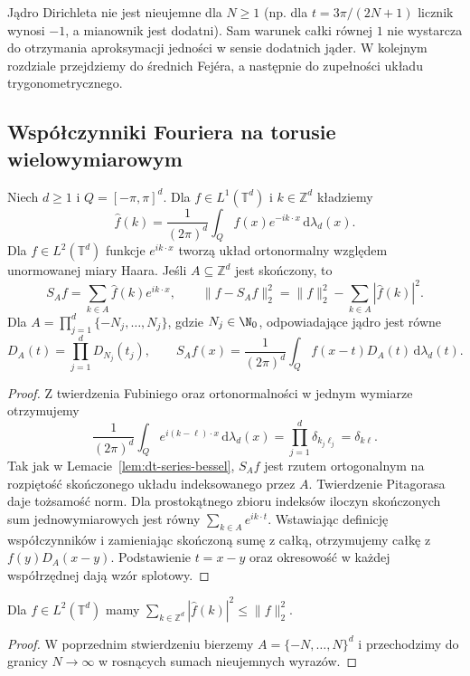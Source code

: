 Jądro Dirichleta nie jest nieujemne dla $N\ge1$
(np. dla $t=3\pi/(2N+1)$ licznik wynosi $-1$,
a mianownik jest dodatni). Sam warunek całki
równej $1$ nie wystarcza do otrzymania aproksymacji
jedności w sensie dodatnich jąder. W kolejnym
rozdziale przejdziemy do średnich Fejéra, a następnie
do zupełności układu trygonometrycznego.

\subsection{Współczynniki Fouriera na torusie wielowymiarowym}

\begin{stwierdzenie}
\label{prop:dt-series-torus}
Niech $d\ge1$ i $Q=[-\pi,\pi]^d$. Dla
$f\in L^1(\mathbb T^d)$ i $k\in\mathbb Z^d$ kładziemy
\[
 \widehat f(k)=\frac1{(2\pi)^d}
 \int_Q f(x)e^{-ik\cdot x}\,\mathrm d\lambda_d(x).
\]
Dla $f\in L^2(\mathbb T^d)$ funkcje $e^{ik\cdot x}$
tworzą układ ortonormalny względem unormowanej
miary Haara. Jeśli $A\subseteq\mathbb Z^d$
jest skończony, to
\[
 S_Af=\sum_{k\in A}\widehat f(k)e^{ik\cdot x},
 \qquad
 \|f-S_Af\|_2^2=\|f\|_2^2-\sum_{k\in A}|\widehat f(k)|^2.
\]
Dla $A=\prod_{j=1}^d\{-N_j,\ldots,N_j\}$,
gdzie $N_j\in\N_0$, odpowiadające jądro jest równe
\[
 D_A(t)=\prod_{j=1}^d D_{N_j}(t_j),\qquad
 S_Af(x)=\frac1{(2\pi)^d}\int_Q
 f(x-t)D_A(t)\,\mathrm d\lambda_d(t).
\]
\end{stwierdzenie}
\begin{proof}
Z twierdzenia Fubiniego oraz ortonormalności
w jednym wymiarze otrzymujemy
\[
 \frac1{(2\pi)^d}\int_Q e^{i(k-\ell)\cdot x}
 \,\mathrm d\lambda_d(x)
 =\prod_{j=1}^d\delta_{k_j\ell_j}=\delta_{k\ell}.
\]
Tak jak w Lemacie~\ref{lem:dt-series-bessel},
$S_Af$ jest rzutem ortogonalnym na rozpiętość
skończonego układu indeksowanego przez $A$.
Twierdzenie Pitagorasa daje tożsamość norm.
Dla prostokątnego zbioru indeksów iloczyn
skończonych sum jednowymiarowych jest równy
$\sum_{k\in A}e^{ik\cdot t}$. Wstawiając
definicję współczynników i zamieniając skończoną
sumę z całką, otrzymujemy całkę z $f(y)D_A(x-y)$.
Podstawienie $t=x-y$ oraz okresowość w każdej
współrzędnej dają wzór splotowy.
\end{proof}

\begin{wniosek}
\label{cor:dt-series-torus-bessel}
Dla $f\in L^2(\mathbb T^d)$ mamy
$\sum_{k\in\mathbb Z^d}|\widehat f(k)|^2\le\|f\|_2^2$.
\end{wniosek}
\begin{proof}
W poprzednim stwierdzeniu bierzemy
$A=\{-N,\ldots,N\}^d$ i przechodzimy
do granicy $N\to\infty$ w rosnących sumach
nieujemnych wyrazów.
\end{proof}

